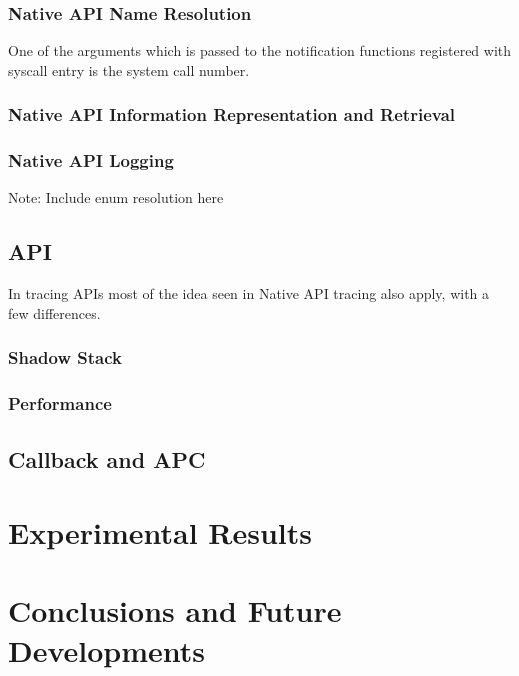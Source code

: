 \documentclass[binding=0.6cm,LaM,english,noexaminfo,oneside]{sapthesis} %
\begin{document}
\subsection{Native API Name Resolution}

One of the arguments which is passed to the notification functions registered with syscall entry is the system call number. 


\subsection{Native API Information Representation and Retrieval}
\subsection{Native API Logging}
Note: Include enum resolution here


\section{API}
In tracing APIs most of the idea seen in Native API tracing also apply, with a few differences.

\subsection{Shadow Stack}
\subsection{Performance}
\section{Callback and APC} 

\chapter{Experimental Results}

\chapter{Conclusions and Future Developments}

\printbibliography 


\end{document}
